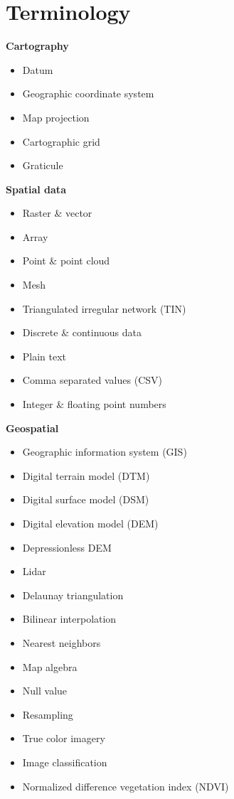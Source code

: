 \documentclass[11pt,article,oneside]{memoir}
\begin{document}
\clearpage

\section{Terminology}
\begin{multicols}{2}
\raggedright
\small
%
\textbf{Cartography}
\begin{itemize}
\item Datum
\item Geographic coordinate system
\item Map projection
\item Cartographic grid
\item Graticule
\end{itemize}

\textbf{Spatial data}
\begin{itemize}
\item Raster \& vector
\item Array
\item Point \& point cloud
\item Mesh
\item Triangulated irregular network (TIN)
\item Discrete \& continuous data
\item Plain text
\item Comma separated values (CSV)
\item Integer \& floating point numbers
\end{itemize}

\textbf{Geospatial}
\begin{itemize}
\item Geographic information system (GIS)
\item Digital terrain model (DTM)
\item Digital surface model (DSM)
\item Digital elevation model (DEM)
\item Depressionless DEM
\item Lidar
\item Delaunay triangulation
\item Bilinear interpolation
\item Nearest neighbors
\item Map algebra
\item Null value
\item Resampling
\item True color imagery
\item Image classification
\item Normalized difference vegetation index (NDVI)
\end{itemize}


\end{multicols}
\end{document}
